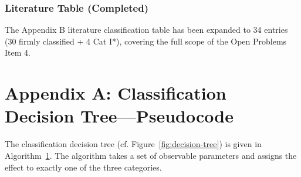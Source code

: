 \documentclass[11pt]{article}
\begin{document}
\subsubsection{Literature Table (Completed)}

The Appendix B literature classification table has been expanded to 34 entries (30 firmly classified + 4 Cat I*), covering the full scope of the Open Problems Item 4.

\appendix

\section{Appendix A: Classification Decision Tree---Pseudocode}

\label{app:decision-tree}

The classification decision tree (cf. Figure~\ref{fig:decision-tree}) is given in Algorithm~\ref{app:decision-tree}. The algorithm takes a set of observable parameters and assigns the effect to exactly one of the three categories.
\end{document}
